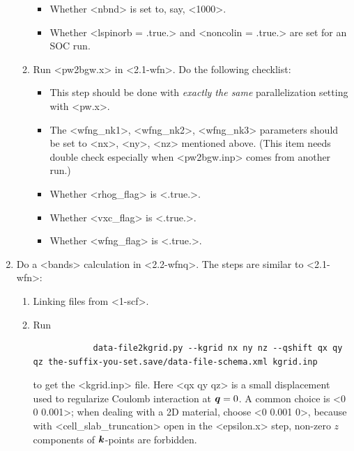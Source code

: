 \documentclass[hyperref, a4paper]{report}
\def\texttt#1{<#1>}%
\newcommand{\shortcode}[1]{\texttt{#1}}
\begin{document}
\begin{enumerate}
\begin{enumerate}
\begin{itemize}
            \item Whether \shortcode{nbnd} is set to, say, \shortcode{1000}.
            \item Whether \shortcode{lspinorb = .true.} and \shortcode{noncolin = .true.} 
            are set for an SOC run.
        \end{itemize}
        \item Run \shortcode{pw2bgw.x} in \shortcode{2.1-wfn}.
        Do the following checklist:
        \begin{itemize}
            \item This step should be done 
            with \emph{exactly the same} parallelization setting with \shortcode{pw.x}.
            \item The \shortcode{wfng_nk1}, \shortcode{wfng_nk2}, \shortcode{wfng_nk3} 
            parameters should be set to \shortcode{nx}, \shortcode{ny}, \shortcode{nz}
            mentioned above.
            (This item needs double check especially 
            when \shortcode{pw2bgw.inp} comes from another run.)
            \item Whether \shortcode{rhog_flag} is \shortcode{.true.}.
            \item Whether \shortcode{vxc_flag} is \shortcode{.true.}.
            \item Whether \shortcode{wfng_flag} is \shortcode{.true.}.
        \end{itemize}
    \end{enumerate}
    \item Do a \shortcode{bands} calculation in \shortcode{2.2-wfnq}. 
    The steps are similar to \shortcode{2.1-wfn}:
    \begin{enumerate}
        \item Linking files from \shortcode{1-scf}.
        \item Run 
        \begin{lstlisting}
            data-file2kgrid.py --kgrid nx ny nz --qshift qx qy qz the-suffix-you-set.save/data-file-schema.xml kgrid.inp
        \end{lstlisting}
        to get the \shortcode{kgrid.inp} file.
        Here \shortcode{qx qy qz} is a small displacement 
        used to regularize Coulomb interaction at $\vb*{q} = 0$.
        A common choice is \shortcode{0 0 0.001};
        when dealing with a 2D material, choose \shortcode{0 0.001 0},
        because with \shortcode{cell_slab_truncation} open in the \shortcode{epsilon.x} step,
        non-zero $z$ components of $\vb*{k}$-points are forbidden.

\end{enumerate}
\end{enumerate}
\end{document}
